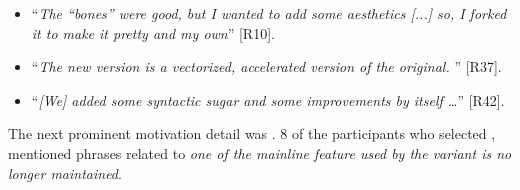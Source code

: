 \begin{itemize}[leftmargin=*]
\item ``\emph{The ``bones'' were good, but I wanted to add some aesthetics [...]%
so, I forked it to make it pretty and my own}'' [R10].
\item ``\emph{The new version is a vectorized, accelerated version of the original.%
}'' [R37].
\item ``\emph{[We] added some syntactic sugar and some improvements by itself \ldots}'' [R42].
\end{itemize}

\nd The next prominent  motivation detail was .
8 of the participants who selected , mentioned phrases related to \emph{one of the mainline feature used by the variant is no longer maintained}.

